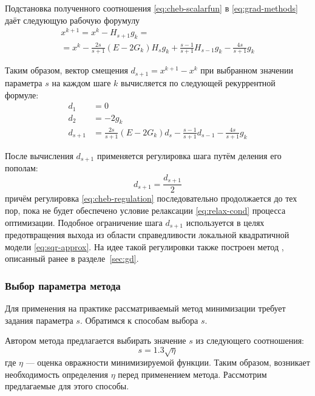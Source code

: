 Подстановка полученного соотношения \eqref{eq:cheb-scalarfun}
в \eqref{eq:grad-methods} даёт следующую рабочую форумулу
\begin{multline}
  x^{k+1} = x^k - H_{s+1}g_k =\\=
  x^k-\frac{2s}{s+1}(E-2G_k)H_sg_k+\frac{s-1}{s+1}H_{s-1}g_k-\frac{4s}{s+1}g_k
\end{multline}

Таким образом, вектор смещения $d_{s+1} = x^{k+1} - x^k$ при выбранном
значении параметра $s$ на каждом шаге $k$ вычисляется по следующей
рекуррентной формуле:
\begin{equation}
  \label{eq:cheb-workhorse}
  \begin{aligned}
    d_1 &= 0\\
    d_2 &= -2g_k \\
    d_{s+1} &=
    \frac{2s}{s+1}(E-2G_k)d_{s}-\frac{s-1}{s+1}d_{s-1}-\frac{4s}{s+1}g_k
  \end{aligned}
\end{equation}

После вычисления $d_{s+1}$ применяется регулировка шага путём деления
его пополам:
\begin{equation}
  \label{eq:cheb-regulation}
  d_{s+1} = \frac{d_{s+1}}{2}
\end{equation}
причём регулировка \eqref{eq:cheb-regulation} последовательно
продолжается до тех пор, пока не будет обеспечено условие релаксации
\eqref{eq:relax-cond} процесса оптимизации. Подобное ограничение шага
$d_{s+1}$ используется в целях предотвращения выхода из области
справедливости локальной квадратичной модели \eqref{eq:sqr-approx}. На
идее такой регулировки также построен метод \rgd{}, описанный ранее в
разделе \ref{sec:gd}.

\subsubsection{Выбор параметра метода}
\label{sec:cheb-param}

Для применения на практике рассматриваемый метод минимизации требует
задания параметра $s$. Обратимся к способам выбора $s$.

Автором метода предлагается выбирать значение $s$ из следующего
соотношения:
\begin{equation}
  \label{eq:cheb-param}
  s = 1.3 \sqrt{\eta}
\end{equation}
где $\eta$ — оценка овражности минимизируемой функции. Таким образом,
возникает необходимость определения $\eta$ перед применением метода.
Рассмотрим предлагаемые для этого способы.

